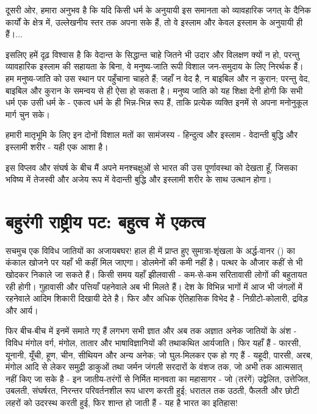 दूसरी ओर, हमारा अनुभव है कि यदि किसी धर्म के अनुयायी इस समानता को व्यावहारिक जगत् के दैनिक कार्यों के क्षेत्र में, उल्लेखनीय स्तर तक अपना सके हैं, तो वे इस्लाम और केवल इस्लाम के अनुयायी ही हैं।... 

इसलिए हमें दृढ़ विश्वास है कि वेदान्त के सिद्धान्त चाहे जितने भी उदार और विलक्षण क्यों न हो, परन्तु व्यावहारिक इस्लाम की सहायता के बिना, वे मनुष्य-जाति रूपी विशाल जन-समुदाय के लिए निरर्थक हैं। हम मनुष्य-जाति को उस स्थान पर पहुँचाना चाहते हैं; जहाँ न वेद है, न बाइबिल और न कुरान; परन्तु वेद, बाइबिल और कुरान के समन्वय से ही ऐसा हो सकता है। मनुष्य जाति को यह शिक्षा देनी होगी कि सभी धर्म एक उसी धर्म के - एकत्व धर्म के ही भिन्न-भिन्न रूप हैं, ताकि प्रत्येक व्यक्ति इनमें से अपना मनोनुकूल मार्ग चुन सके। 

हमारी मातृभूमि के लिए इन दोनों विशाल मतों का सामंजस्य - हिन्दुत्व और इस्लाम - वेदान्ती बुद्धि और इस्लामी शरीर - यही एक आशा है। 

इस विप्लव और संघर्ष के बीच मैं अपने मनश्चक्षुओं से भारत की उस पूर्णावस्था को देखता हूँ, जिसका भविष्य में तेजस्वी और अजेय रूप में वेदान्ती बुद्धि और इस्लामी शरीर के साथ उत्थान होगा।


\section*{बहुरंगी राष्ट्रीय पट: बहुत्व में एकत्व}


सचमुच एक विविध जातियों का अजायबघर! हाल ही में प्राप्त हुए सुमात्रा-शृंखला के अर्द्ध-वानर () का कंकाल खोजने पर यहाँ भी कहीं मिल जाएगा। डोलमेनों की कमी नहीं है। पत्थर के औजार कहीं से भी खोदकर निकाले जा सकते हैं। किसी समय यहाँ झीलवासी - कम-से-कम सरितावासी लोगों की बहुतायत रही होगी। गुहावासी और पत्तियाँ पहनेवाले अब भी मिलते हैं। देश के विभिन्न भागों में आज भी जंगलों में रहनेवाले आदिम शिकारी दिखायी देते है। फिर और अधिक ऐतिहासिक विभेद है - निग्रीटो-कोलारी, द्रविड़ और आर्य। 

फिर बीच-बीच में इनमें समाते गए हैं लगभग सभी ज्ञात और अब तक अज्ञात अनेक जातियों के अंश - विविध मंगोल वर्ग, मंगोल, तातार और भाषाविज्ञानियों की तथाकथित आर्यजाति। फिर यहाँ हैं - फारसी, यूनानी, यूँची, हूण, चीन, सीथियन और अन्य अनेक; जो घुल-मिलकर एक हो गए हैं - यहूदी, पारसी, अरब, मंगोल आदि से लेकर समुद्री डाकुओं तथा जर्मन जंगली सरदारों के वंशज तक, जो अभी तक आत्मसात् नहीं किए जा सके है - इन जातीय-तरंगों से निर्मित मानवता का महासागर - जो (तरंगें) उद्वेलित, उत्तेजित, उबलती, संघर्षरत, निरन्तर परिवर्तनशील रूप धारण करती हुई; धरातल तक उठती, फैलती और छोटी लहरों को उदरस्थ करती हुई, फिर शान्त हो जाती हैं - यह है भारत का इतिहास! 


